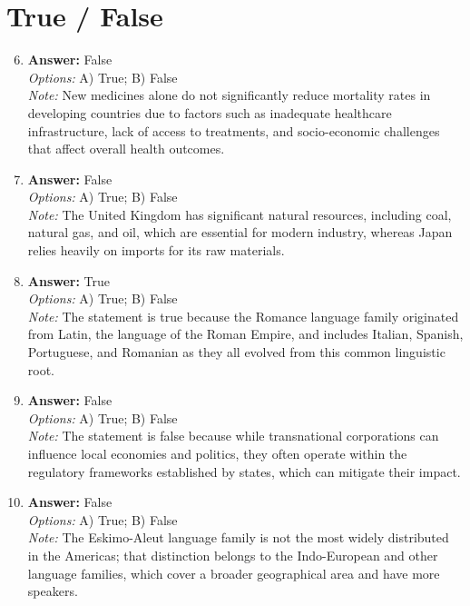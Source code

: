 \documentclass[12pt]{article}
\begin{document}
\section*{True / False}
\begin{enumerate}[label=\arabic*.]
\setcounter{enumi}{5}
\item \textbf{Answer:} False
\\ \textit{Options:} A) True; B) False
\\ \textit{Note:} New medicines alone do not significantly reduce mortality rates in developing countries due to factors such as inadequate healthcare infrastructure, lack of access to treatments, and socio-economic challenges that affect overall health outcomes.
\item \textbf{Answer:} False
\\ \textit{Options:} A) True; B) False
\\ \textit{Note:} The United Kingdom has significant natural resources, including coal, natural gas, and oil, which are essential for modern industry, whereas Japan relies heavily on imports for its raw materials.
\item \textbf{Answer:} True
\\ \textit{Options:} A) True; B) False
\\ \textit{Note:} The statement is true because the Romance language family originated from Latin, the language of the Roman Empire, and includes Italian, Spanish, Portuguese, and Romanian as they all evolved from this common linguistic root.
\item \textbf{Answer:} False
\\ \textit{Options:} A) True; B) False
\\ \textit{Note:} The statement is false because while transnational corporations can influence local economies and politics, they often operate within the regulatory frameworks established by states, which can mitigate their impact.
\item \textbf{Answer:} False
\\ \textit{Options:} A) True; B) False
\\ \textit{Note:} The Eskimo-Aleut language family is not the most widely distributed in the Americas; that distinction belongs to the Indo-European and other language families, which cover a broader geographical area and have more speakers.
\end{enumerate}
\end{document}

